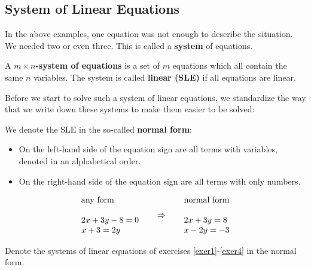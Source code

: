 \subsection{System of Linear Equations}

In the above examples, one equation was not enough to describe the situation. We needed two or even three. This is called a \textbf{system} of equations. 
\vsp


\begin{tcolorbox}[colback=white]
\begin{definition}
A \textbf{$m\times n$-system of equations} is a set of $m$ equations which all contain the same $n$ variables. The system is called \textbf{linear (SLE)} if all equations are linear. 
\end{definition}
\end{tcolorbox}
\vsp

Before we start to solve such a system of linear equations, we standardize the way that we write down these systems to make them easier to be solved:
\vsp

\begin{tcolorbox}[colback=white]
We denote the SLE in the so-called \textbf{normal form}: 
\begin{itemize}
\item On the left-hand side of the equation sign are all terms with variables, denoted in an alphabetical order. 
\item On the right-hand side of the equation sign are all terms with only numbers. 
\end{itemize}
\end{tcolorbox}
\vsp

\begin{example}
\[
\begin{array}{ll}
\text{any form}\\
\\
2x+3y-8=0 \\
x+3=2y 
\end{array}
\hspace{5mm}\Rightarrow\hspace{5mm}
\begin{array}{ll}
\text{normal form}\\
\\
2x+3y=8 \\
x-2y=-3 
\end{array}
\]
\end{example}
\vsp

\begin{exer} 
Denote the systems of linear equations of exercises \ref{exer1}-\ref{exer4} in the normal form.
\end{exer}

